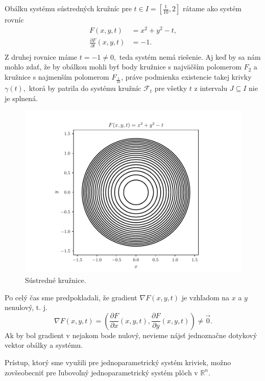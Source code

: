 \begin{example} 
Obálku systému sústredných kružníc pre $t \in I=[\frac{1}{10},2]$ rátame ako systém rovníc
\begin{align*}
F(x, y, t) &= x^2 + y^2 - t, \\
\frac{\partial F}{\partial t}(x,y,t) &= -1. \\
\end{align*}
Z druhej rovnice máme $t=-1 \neq 0,$ teda systém nemá riešenie. Aj keď by sa nám mohlo zdať, že by obálkou mohli byť body kružnice s najväčším polomerom $F_2$ a kružnice s najmenším polomerom $F_{\frac{1}{10}}$, práve podmienka existencie takej krivky $\gamma(t),$ ktorá by patrila do systému kružníc $\mathcal{F}_t$ pre všetky $t$ z intervalu $J \subseteq  I $ nie je splnená.
\end{example}

\begin{figure}[H]
	\centering
	\includegraphics{images/concentric_circles.pdf}
	\caption{Sústredné kružnice.}
	\label{fig:concentric_circles}
\end{figure}

Po celý čas sme predpokladali, že gradient $\nabla F(x,y,t) $ je vzhľadom na $x$ a $y$ nenulový, t. j.
$$\nabla F(x, y, t) = \left(\frac{\partial F}{\partial x}(x, y, t), \frac{\partial F}{\partial y}(x, y, t) \right) \neq \vec{0}.$$ Ak by bol gradient v nejakom bode nulový, nevieme nájsť jednoznačne dotykový vektor obálky a systému. 

Prístup, ktorý sme využili pre jednoparametrický systém kriviek, možno zovšeobecniť pre ľubovoľný jednoparametrický systém plôch v $\mathbb{R}^n.$

